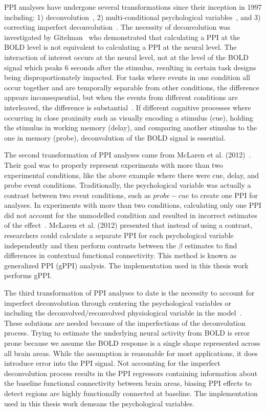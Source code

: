 \documentclass[phd,appendix,figures]{uithesis}
\begin{document}
PPI analyses have undergone several transformations since their inception in 1997 including:
1) deconvolution~\cite{Gitelman2003}, 2) multi-conditional psychological variables~\cite{McLaren2012},
and 3) correcting imperfect deconvolution~\cite{Di2017}.
The necessity of deconvolution was investigated by Gitelman~\cite{Gitelman2003} who demonstrated
that calculating a PPI at the BOLD level is not equivalent to calculating
a PPI at the neural level.
The interaction of interest occurs at the neural level, not at the level of the BOLD signal
which peaks 6 seconds after the stimulus, resulting in certain task designs being
disproportionately impacted.
For tasks where events in one condition all occur together and are temporally separable
from other conditions, the difference appears inconsequential, but when the events
from different conditions are interleaved, the difference is substantial~\cite{Gitelman2003}.
If different cognitive processes where occurring in close proximity such as visually encoding
a stimulus (cue), holding the stimulus in working memory (delay), and comparing another stimulus to the one
in memory (probe), deconvolution of the BOLD signal is essential.

The second transformation of PPI analyses came from McLaren et al. (2012)~\cite{McLaren2012}.
Their goal was to properly represent experiments with more than two experimental conditions, like
the above example where there were cue, delay, and probe event conditions.
Traditionally, the psychological variable was actually a contrast between two event conditions, such as
$probe - cue$ to create one PPI for analyses.
In experiments with more than two conditions, calculating only one PPI did not account
for the unmodelled condition and resulted in incorrect estimates of the effect~\cite{McLaren2012}.
McLaren et al. (2012) presented that instead of using a contrast, researchers could
calculate a separate PPI for each psychological variable independently and then
perform contrasts between the $\beta$ estimates to find differences in contextual functional connectivity.
This method is known as generalized PPI (gPPI) analysis.
The implementation used in this thesis work performs gPPI.

The third transformation of PPI analyses to date is the necessity to account for imperfect deconvolution
through centering the psychological variables or including the deconvolved/reconvolved physiological variable
in the model~\cite{Di2017}.
These solutions are needed because of the imperfections of the deconvolution process.
Trying to estimate the underlying neural activity from BOLD is error prone because we
assume the BOLD response is a single shape represented across all brain areas.
While the assumption is reasonable for most applications, it does introduce error
into the PPI signal.
Not accounting for the imperfect deconvolution process results in the PPI regressors
containing information about the baseline functional connectivity between brain areas, biasing
PPI effects to detect regions are highly functionally connected at baseline.
The implementation used in this thesis work demeans the psychological variables.
\end{document}
